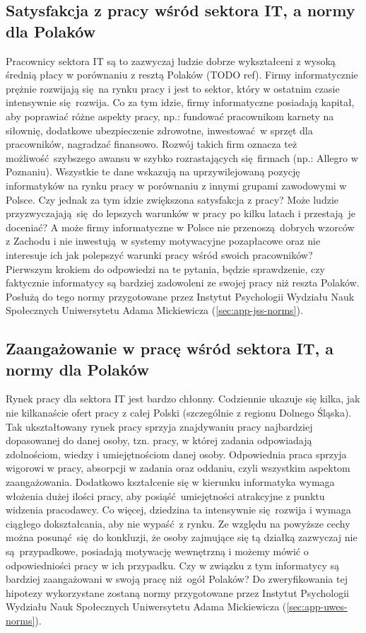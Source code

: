 \subsection{Satysfakcja z pracy wśród sektora IT, a normy dla Polaków}
\label{sec:hip-sat-norms}
Pracownicy sektora IT są to zazwyczaj ludzie dobrze wykształceni z wysoką średnią płacy w porównaniu z resztą Polaków (TODO ref). Firmy informatycznie prężnie rozwijają się na rynku pracy i jest to sektor, który w ostatnim czasie intensywnie się rozwija. Co za tym idzie, firmy informatyczne posiadają kapitał, aby poprawiać różne aspekty pracy, np.: fundować pracownikom karnety na siłownię, dodatkowe ubezpieczenie zdrowotne, inwestować w sprzęt dla pracowników, nagradzać
finansowo. Rozwój takich firm oznacza też możliwość szybszego awansu w szybko rozrastających się firmach (np.: Allegro w Poznaniu). Wszystkie te dane wskazują na uprzywilejowaną pozycję informatyków na rynku pracy w porównaniu z innymi grupami zawodowymi w Polsce. Czy jednak za tym idzie zwiększona satysfakcja z pracy? Może ludzie przyzwyczajają się do lepszych warunków w pracy po kilku latach i przestają je doceniać? A może firmy informatyczne w Polsce nie
przenoszą dobrych wzorców z Zachodu i nie inwestują w systemy motywacyjne pozapłacowe oraz nie interesuje ich jak polepszyć warunki pracy wśród swoich pracowników? Pierwszym krokiem do odpowiedzi na te pytania, będzie sprawdzenie, czy faktycznie informatycy są bardziej zadowoleni ze swojej pracy niż reszta Polaków. Posłużą do tego normy przygotowane przez Instytut Psychologii Wydziału Nauk Społecznych Uniwersytetu Adama Mickiewicza (\ref{sec:app-jss-norms}).

\subsection{Zaangażowanie w pracę wśród sektora IT, a normy dla Polaków}
Rynek pracy dla sektora IT jest bardzo chłonny. Codziennie ukazuje się kilka, jak nie kilkanaście ofert pracy z całej Polski (szczególnie z regionu Dolnego Śląska). Tak ukształtowany rynek pracy sprzyja znajdywaniu pracy najbardziej dopasowanej do danej osoby, tzn. pracy, w której zadania odpowiadają zdolnościom, wiedzy i umiejętnościom danej osoby. Odpowiednia praca sprzyja wigorowi w pracy, absorpcji w zadania oraz oddaniu, czyli wszystkim aspektom zaangażowania. Dodatkowo kształcenie
się w kierunku informatyka wymaga włożenia dużej ilości pracy, aby posiąść umiejętności atrakcyjne z punktu widzenia pracodawcy. Co więcej, dziedzina ta intensywnie się rozwija i wymaga ciągłego dokształcania, aby nie wypaść z rynku. Ze względu na powyższe cechy można posunąć się do konkluzji, że osoby zajmujące się tą działką zazwyczaj nie są przypadkowe, posiadają motywację wewnętrzną i możemy mówić o odpowiedniości pracy w ich przypadku. Czy w związku z tym informatycy są bardziej zaangażowani w swoją pracę
niż ogół Polaków? Do zweryfikowania tej hipotezy wykorzystane zostaną normy przygotowane przez Instytut Psychologii Wydziału Nauk Społecznych Uniwersytetu Adama Mickiewicza (\ref{sec:app-uwes-norms}). 
